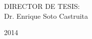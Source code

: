 \begin{titlepage}
\begin{minipage}[c][9.5cm][s]{11cm}
\begin{center}
    \vspace{2cm}

    {\small DIRECTOR DE TESIS:\\ Dr. Enrique Soto Castruita}

    \vspace{0.5cm}


    \vspace{1.5cm}

    2014

  \end{center}
\end{minipage}

\end{titlepage}